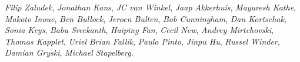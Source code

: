 \emph{Filip Zaludek},
\emph{Jonathan Kans},
\emph{JC van Winkel},
\emph{Jaap Akkerhuis},
\emph{Mayuresh Kathe},
\emph{Makoto Inoue},
\emph{Ben Bullock},
\emph{Jeroen Bulten},
\emph{Bob Cunningham},
\emph{Dan Kortschak},
\emph{Sonia Keys},
\emph{Babu Sreekanth},
\emph{Haiping Fan},
\emph{Cecil New},
\emph{Andrey Mirtchovski},
\emph{Thomas Kapplet},
\emph{Uriel}
\emph{Brian Fallik},
\emph{Paulo Pinto},
\emph{Jinpu Hu},
\emph{Russel Winder},
\emph{Damian Gryski},
\emph{Michael Stapelberg}.
